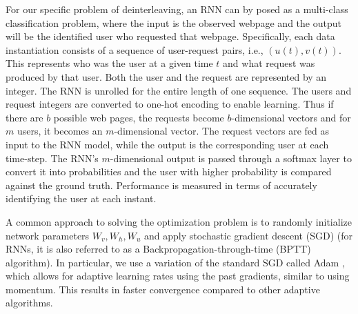 	
	For our specific problem of deinterleaving, an RNN can 
        by posed as a multi-class classification problem, where
        the input is the observed webpage and the output will be the
        identified user who requested that webpage. Specifically, each
        data instantiation consists of a sequence of user-request
        pairs, i.e., $(u(t), v(t))$.  This represents who was the user
        at a given time $t$ and what request was produced by that
        user. Both the user and the request are represented by an
        integer. The RNN is unrolled for the entire length of one
        sequence. The users and request integers are converted to
        one-hot encoding to enable learning. Thus if there are $b$
        possible web pages, the requests become $b$-dimensional
        vectors and for $m$ users, it becomes an $m$-dimensional
        vector. The request vectors are fed as input to the RNN model,
        while the output is the corresponding user at each
        time-step. The RNN’s $m$-dimensional output is passed through
        a softmax layer to convert it into probabilities and the user
        with higher probability is compared against the ground
        truth. Performance is measured in terms of accurately
        identifying the user at each instant.
	
	A common approach to solving the optimization problem is to
        randomly initialize network parameters $W_v, W_h, W_u$ and
        apply stochastic gradient descent (SGD) (for RNNs, it is also
        referred to as a Backpropagation-through-time (BPTT)
        algorithm). In particular, we use a variation of the standard
        SGD called Adam \cite{kingma2014adam}, which allows for
        adaptive learning rates using the past gradients, similar to
        using momentum. This results in faster convergence compared to
        other adaptive algorithms.
	
	
	
